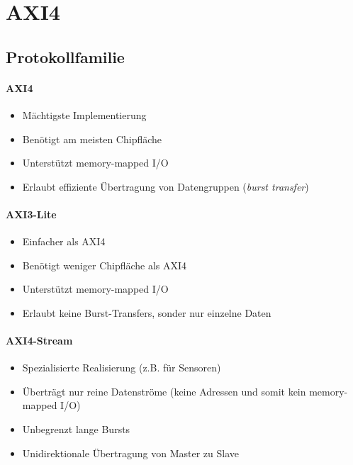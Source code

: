 \documentclass[a4paper, 11pt, accentcolor = tud3b]{tudreport}
\begin{document}
		\section{AXI4}
			\subsection{Protokollfamilie}
				\paragraph{AXI4}
					\begin{itemize}
						\item Mächtigste Implementierung
						\item Benötigt am meisten Chipfläche
						\item Unterstützt memory-mapped I/O
						\item Erlaubt effiziente Übertragung von Datengruppen (\textit{burst transfer})
					\end{itemize}
				
				\paragraph{AXI3-Lite}
					\begin{itemize}
						\item Einfacher als AXI4
						\item Benötigt weniger Chipfläche als AXI4
						\item Unterstützt memory-mapped I/O
						\item Erlaubt keine Burst-Transfers, sonder nur einzelne Daten
					\end{itemize}
				
				\paragraph{AXI4-Stream}
					\begin{itemize}
						\item Spezialisierte Realisierung (z.B. für Sensoren)
						\item Überträgt nur reine Datenströme (keine Adressen und somit kein memory-mapped I/O)
						\item Unbegrenzt lange Bursts
						\item Unidirektionale Übertragung von Master zu Slave
					\end{itemize}
			
\end{document}
